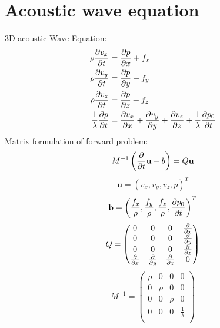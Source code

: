 \documentclass[pdftex,a4paper,parskip,listof=totoc,bibliography=totoc,onehalfspacing,12pt]{scrreprt}
\begin{document}
\section{Acoustic wave equation}
3D acoustic Wave Equation:
\begin{align}
\rho\pdv{v_x}{t}&=\pdv{p}{x} + f_x\\
\rho\pdv{v_y}{t}&=\pdv{p}{y} + f_y\\
\rho\pdv{v_z}{t}&=\pdv{p}{z} + f_z\\
\frac{1}{\lambda}\pdv{p}{t} &= \pdv{v_x}{x} +  \pdv{v_y}{y} + \pdv{v_z}{z} + \frac{1}{\lambda}\pdv{p_0}{t}\\
\end{align}
Matrix formulation of forward problem:
\begin{equation}
 M^{-1}\left( \pdv{}{t}\mathbf{u}-b \right) =Q\mathbf{u}
\end{equation}
\begin{equation}
\mathbf{u}=\left(v_x,v_y,v_z,p \right)^T
\end{equation}
\begin{equation}
\mathbf{b}=\left(\frac{f_x}{\rho},\frac{f_y}{\rho},\frac{f_z}{\rho},\pdv{p_0}{t}\right)^T
\end{equation}
\begin{equation}
Q=
 \begin{pmatrix}
   0         & 0         & 0         & \pdv{}{x}\\
   0         & 0         & 0         & \pdv{}{y}\\
   0         & 0         & 0         & \pdv{}{z}\\
   \pdv{}{x} & \pdv{}{y} & \pdv{}{z} & 0        \\

 \end{pmatrix}
\end{equation}
\begin{equation}
M^{-1}=
 \begin{pmatrix}
   \rho       & 0         & 0         & 0                \\
   0          & \rho      & 0         & 0                \\
   0          & 0         & \rho      & 0                \\
   0          & 0         & 0         & \frac{1}{\lambda}\\
 \end{pmatrix}
\end{equation}
\end{document}
